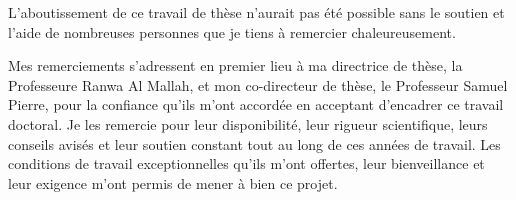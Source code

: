 %

%

\bigskip
\noindent L'aboutissement de ce travail de thèse n'aurait pas été possible sans le soutien et l'aide de nombreuses personnes que je tiens à remercier chaleureusement.

\medskip
\noindent Mes remerciements s'adressent en premier lieu à ma directrice de thèse, la Professeure Ranwa Al Mallah, et mon co-directeur de thèse, le Professeur Samuel Pierre, pour la confiance qu'ils m'ont accordée en acceptant d'encadrer ce travail doctoral. Je les remercie pour leur disponibilité, leur rigueur scientifique, leurs conseils avisés et leur soutien constant tout au long de ces années de travail. Les conditions de travail exceptionnelles qu'ils m'ont offertes, leur bienveillance et leur exigence m'ont permis de mener à bien ce projet.

